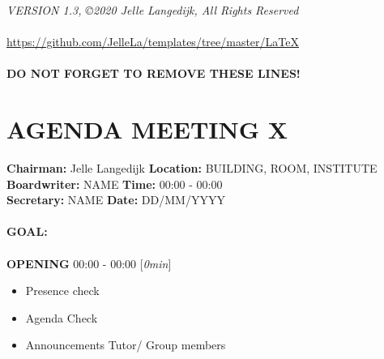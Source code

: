 \documentclass[a4paper,10pt]{article}
\begin{document}
\begin{center}
\textit{VERSION 1.3, ©2020 Jelle Langedijk, All Rights Reserved } \\
\hfill \\
\url{https://github.com/JelleLa/templates/tree/master/LaTeX}\\
\hfill \\
\textbf{DO NOT FORGET TO REMOVE THESE LINES!}\\
\end{center}

\newpage

 \section*{\textbf{AGENDA MEETING X}}
 

\textbf{Chairman:} Jelle Langedijk \hfill \textbf{Location:} BUILDING, ROOM, INSTITUTE \\
\textbf{Boardwriter:} NAME \hfill \textbf{Time:} 00:00 - 00:00 \\
\textbf{Secretary:} NAME \hfill \textbf{Date:} DD/MM/YYYY \\

\hfill \\
\textbf{GOAL:} \\
\hfill \\
\textbf{OPENING} \hfill 00:00 - 00:00 [\textit{0min}]
\begin{itemize}
    \item Presence check
    \item Agenda Check
    \item Announcements Tutor/ Group members
\end{itemize}{}
\end{document}
